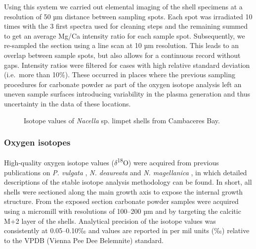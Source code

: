 \documentclass[
  authoryear,
  preprint,
  3p]{elsarticle}
\begin{document}
Using this system we carried out elemental imaging of the shell
specimens at a resolution of 50 µm distance between sampling spots. Each
spot was irradiated 10 times with the 3 first spectra used for cleaning
steps and the remaining summed to get an average Mg/Ca intensity ratio
for each sample spot. Subsequently, we re-sampled the section using a
line scan at 10 µm resolution. This leads to an overlap between sample
spots, but also allows for a continuous record without gaps. Intensity
ratios were filtered for cases with high relative standard deviation
(i.e.~more than 10\%). These occurred in places where the previous
sampling procedures for carbonate powder as part of the oxygen isotope
analysis left an uneven sample surfaces introducing variability in the
plasma generation and thus uncertainty in the data of these locations.

\begin{figure}


\caption{\label{fig-Nac_iso}Isotope values of \emph{Nacella} sp. limpet
shells from Cambaceres Bay.}

\end{figure}%

\subsubsection{Oxygen isotopes}\label{oxygen-isotopes}

High-quality oxygen isotope values (\(\delta\)\textsuperscript{18}O)
were acquired from previous publications on \emph{P. vulgata}
\citep{Surge2012-ba, Graniero2017-io}, \emph{N. deaureata} and \emph{N.
magellanica} \citep{Nicastro2020-ih}, in which detailed descriptions of
the stable isotope analysis methodology can be found. In short, all
shells were sectioned along the main growth axis to expose the internal
growth structure. From the exposed section carbonate powder samples were
acquired using a micromill with resolutions of 100--200 µm and by
targeting the calcitic M+2 layer of the shells. Analytical precision of
the isotope values was consistently at 0.05--0.10‰ and values are
reported in per mil units (‰) relative to the VPDB (Vienna Pee Dee
Belemnite) standard.
\end{document}
